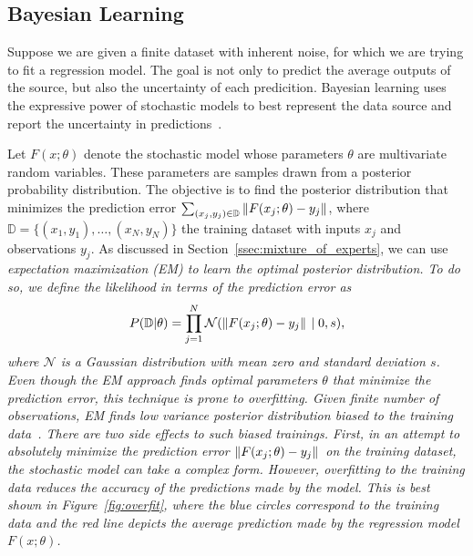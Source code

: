 \subsection{Bayesian Learning}
\label{ssec:bayesianLearning}

Suppose we are given a finite dataset with inherent noise, for which
we are trying to fit a regression model.
%
The goal is not only to predict the average outputs of the source, but also
the uncertainty of each predicition.
%
Bayesian learning uses the expressive power of stochastic models to best
represent the data source and report the uncertainty in
predictions~\cite{bishop2006pattern}.


Let $F(x; \theta)$ denote the stochastic model whose parameters $\theta$ are
multivariate random variables.
%
These parameters are samples drawn from a posterior probability
distribution.
%
The objective is to find the posterior distribution that minimizes the
prediction error $\sum_{(x_j, y_j) \in \mathbb{D}} \|{F(x_j; \theta) -
y_j}\|_{{}_{}}$, where $\mathbb{D} = \{(x_1, y_1), \dots, (x_N, y_N) \}$ the training
dataset with inputs $x_j$ and observations $y_j$.
%
As discussed in Section~\ref{ssec:mixture_of_experts}, we can use
\it{expectation maximization} \normalfont (EM) to learn the optimal posterior
distribution.
%
To do so, we define the likelihood in terms of the prediction error as
\begin{equation*}
  P(\mathbb{D} | \theta)  = \prod_{j=1}^{N} \mathcal{N}(\|{F(x_j; \theta) -  y_j}\|_{{}_{}} \; | \; 0, s),
\end{equation*}
\noindent where $\mathcal{N}$ is a Gaussian distribution with mean zero and
standard deviation $s$. Even though the EM approach finds optimal parameters
$\theta$ that minimize the prediction error, this technique is prone to
overfitting.
%
Given finite number of observations, EM finds low variance posterior
distribution \it{biased to the training
data}\normalfont~\cite{bishop2006pattern}. 
%
There are two side effects to such biased trainings.
%
First, in an attempt to absolutely minimize the prediction error $\|{F(x_j;
\theta) - y_j}\|_{{}_{}}$ on the training dataset, the stochastic model can take a complex form.
%
However, overfitting to the training data reduces the accuracy of the
predictions made by the model.
%
This is best shown in Figure~\ref{fig:overfit}, where the blue circles
correspond to the training data and the red line depicts the average prediction made by
the regression model $F(x; \theta)$.
